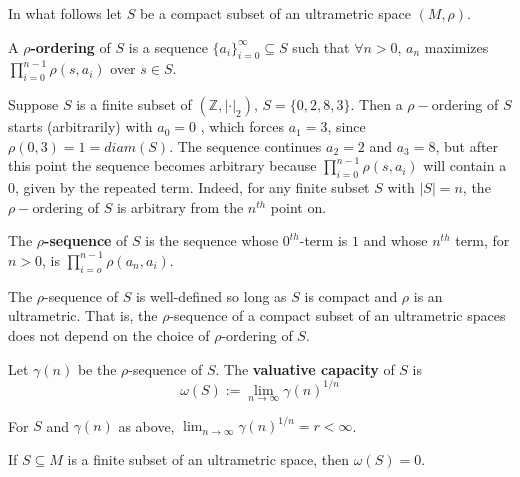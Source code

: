 In what follows let $S$ be a compact subset of an ultrametric space $(M,\rho)$.

\begin{definition}
	\cite{kj} A \textbf{$\rho$-ordering} of $S$ is a sequence $\{a_i\}_{i=0}^\infty \subseteq S$ such that $\forall n > 0$, $a_n$ maximizes $\prod_{i=0}^{n-1} \rho(s,a_i)$ over $s \in S$. 
\end{definition}

\begin{example}
Suppose $S$ is a finite subset of $(\mathbb{Z}, \lvert \cdot \rvert_2)$, $S=\{0,2,8,3\}$. Then a $\rho-$ordering of $S$ starts (arbitrarily) with $a_0=0$ , which forces $a_1=3$, since $\rho(0,3)=1=diam(S)$. The sequence continues $a_2=2$ and $a_3=8$, but after this point the sequence becomes arbitrary because  $\prod_{i=0}^{n-1} \rho(s,a_i)$ will contain a $0$, given by the repeated term. Indeed, for any finite subset $S$ with $\lvert S \rvert = n$, the $\rho-$ordering of $S$ is arbitrary from the $n^{th}$ point on. 
\end{example}

\begin{definition}
	\cite{kj} The \textbf{$\rho$-sequence} of $S$ is the sequence whose $0^{th}$-term is $1$ and whose $n^{th}$ term, for $n >0$, is $\prod_{i=o}^{n-1} \rho(a_n,a_i)$.
\end{definition}

\begin{proposition}
	\cite{kj} The $\rho$-sequence of $S$ is well-defined so long as $S$ is compact and $\rho$ is an ultrametric. That is, the $\rho$-sequence of a compact subset of an ultrametric spaces does not depend on the choice of $\rho$-ordering of $S$.
\end{proposition}

\begin{definition}
	\cite{kj}  Let $\gamma(n)$ be the $\rho$-sequence of $S$. The \textbf{valuative capacity} of $S$ is \[\omega(S)
	:= \lim_{n\to\infty} \gamma(n)^{1/n}\]  
\end{definition}


\begin{proposition}
	\cite{kj} For $S$ and $\gamma(n)$ as above,  $\lim_{n\to\infty} \gamma(n)^{1/n} = r < \infty$. 
\end{proposition}


\begin{proposition}
	If $S \subseteq M$ is a finite subset of an ultrametric space, then $\omega(S) =0$.
\end{proposition}


